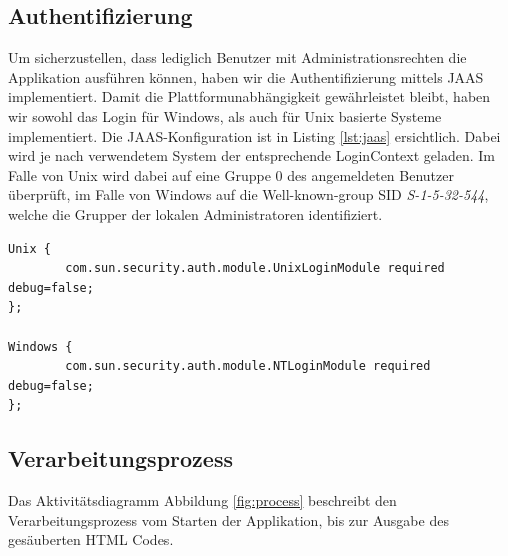 \subsection{Authentifizierung}

Um sicherzustellen, dass lediglich Benutzer mit Administrationsrechten die Applikation ausführen können,
haben wir die Authentifizierung mittels JAAS implementiert. Damit die Plattformunabhängigkeit 
gewährleistet bleibt, haben wir sowohl das Login für Windows, als auch für Unix basierte Systeme 
implementiert. Die JAAS-Konfiguration ist in Listing \ref{lst:jaas} ersichtlich. Dabei wird je
nach verwendetem System der entsprechende LoginContext geladen. Im Falle von Unix wird dabei auf eine
Gruppe 0 des angemeldeten Benutzer überprüft, im Falle von Windows auf die Well-known-group 
SID\cite{MS:SID} \textit{S-1-5-32-544}, welche die Grupper der lokalen Administratoren identifiziert. 
\newline
\begin{lstlisting}[caption="JAAS konfiguration im File jaas\_security.conf", label={lst:jaas}]
Unix {
        com.sun.security.auth.module.UnixLoginModule required debug=false;
};

Windows {
        com.sun.security.auth.module.NTLoginModule required debug=false;
};
\end{lstlisting}

\newpage

\subsection{Verarbeitungsprozess}

Das Aktivitätsdiagramm Abbildung \ref{fig:process} beschreibt den Verarbeitungsprozess vom Starten der Applikation, bis zur Ausgabe des gesäuberten HTML Codes.

